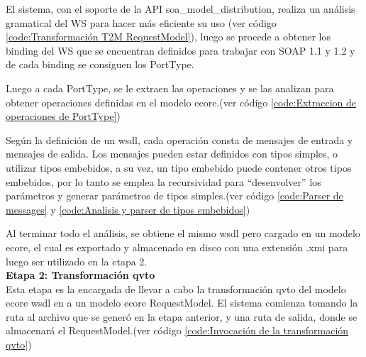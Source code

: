 El sistema, con el soporte de la API soa\_model\_distribution, realiza un análisis gramatical del WS para hacer más eficiente su uso (ver código \ref{code:Transformación T2M RequestModel}), luego se procede a obtener los binding del WS que se encuentran definidos para trabajar con SOAP 1.1 y 1.2 y de cada binding se consiguen los PortType.



Luego a cada PortType, se le extraen las operaciones y se las analizan para obtener operaciones definidas en el modelo ecore.(ver código \ref{code:Extraccion de operaciones de PortType})



Según la definición de un wsdl, cada operación consta de mensajes de entrada y mensajes de salida. Los mensajes pueden estar definidos con tipos simples, o utilizar tipos embebidos, a su vez, un tipo embebido puede contener otros tipos embebidos, por lo tanto se emplea la recursividad para “desenvolver” los parámetros y generar parámetros de tipos simples.(ver código \ref{code:Parser de messages} y \ref{code:Analisis y parser de tipos embebidos})





Al terminar todo el análisis, se obtiene el mismo wsdl pero cargado en un modelo ecore, el cual es exportado y almacenado en disco con una extensión .xmi para luego ser utilizado en la etapa 2.\\

\textbf{Etapa 2: Transformación qvto}\\

Esta etapa es la encargada de llevar a cabo la transformación qvto del modelo ecore wsdl en a un modelo ecore RequestModel. El sistema comienza tomando la ruta al archivo que se generó en la etapa anterior, y una ruta de salida, donde se almacenará el RequestModel.(ver código \ref{code:Invocación de la transformación qvto})

